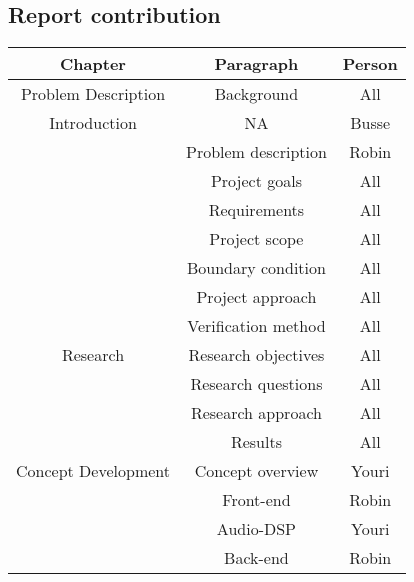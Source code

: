 \begin{justify}


\newpage
\tableofcontents
\thispagestyle{empty}

\listoffigures
\thispagestyle{empty}

\listoftables
\thispagestyle{empty}

\newpage
\pagestyle{plain}

\chapter*{Report contribution}	%
\begin{table}[!h]
	\centering
\begin{tabular}{|c|c|c|}
		\hline
\textbf{Chapter} & \textbf{Paragraph} & \textbf{Person} \\ \hline
Problem Description			& Background					& All	 			\\ \hline
Introduction				& NA							& Busse 			\\ \hline
							& Problem description			& Robin				\\ \hline
							& Project goals					& All				\\ \hline
							& Requirements					& All 				\\ \hline
							& Project scope					& All 				\\ \hline
							& Boundary condition			& All				\\ \hline
							& Project approach				& All				\\ \hline
							& Verification method			& All				\\ \hline
Research 					& Research objectives			& All 				\\ \hline
							& Research questions			& All 				\\ \hline
							& Research approach				& All 				\\ \hline
							& Results						& All 				\\ \hline
Concept Development 		& Concept overview				& Youri				\\ \hline
							& Front-end						& Robin				\\ \hline
							& Audio-DSP						& Youri				\\ \hline
							& Back-end						& Robin				\\ \hline

\end{tabular}
\end{table}
\end{justify}
